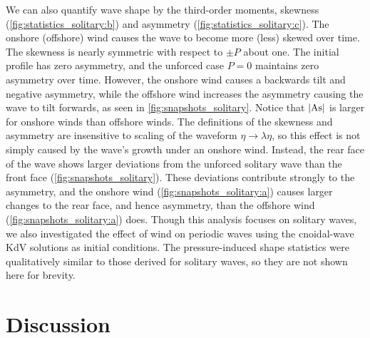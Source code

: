 \documentclass{jfm}
\DeclareMathOperator{\As}{As}
\begin{document}
We can also quantify wave shape by the third-order moments, skewness
(\cref{fig:statistics_solitary:b}) and asymmetry
(\cref{fig:statistics_solitary:c}).
The onshore (offshore) wind causes the wave to become more (less) skewed
over time.
The skewness is nearly symmetric with respect to $\pm P$ about one.
The initial profile has zero asymmetry, and the unforced case
$P=0$ maintains zero asymmetry over time.
However, the onshore wind causes a backwards tilt and negative
asymmetry, while the offshore wind increases the asymmetry causing the
wave to tilt forwards, as seen in \cref{fig:snapshots_solitary}.
Notice that $\abs{\As}$ is larger for onshore winds than offshore winds.
The definitions of the skewness and asymmetry are insensitive to scaling
of the waveform $\eta \to \lambda \eta$, so this effect is not simply
caused by the wave's growth under an onshore wind.
Instead, the rear face of the wave shows larger deviations from the
unforced solitary wave than the front face
(\cref{fig:snapshots_solitary}).
These deviations contribute strongly to the asymmetry, and the onshore
wind (\cref{fig:snapshots_solitary:a}) causes larger changes to the rear
face, and hence asymmetry, than the offshore wind
(\cref{fig:snapshots_solitary:a}) does.
Though this analysis focuses on solitary waves, we also investigated the
effect of wind on periodic waves using the cnoidal-wave KdV solutions as
initial conditions.
The pressure-induced shape statistics were qualitatively similar to
those derived for solitary waves, so they are not shown here for
brevity.

\section{\label{sec:discussion} Discussion}
\end{document}
